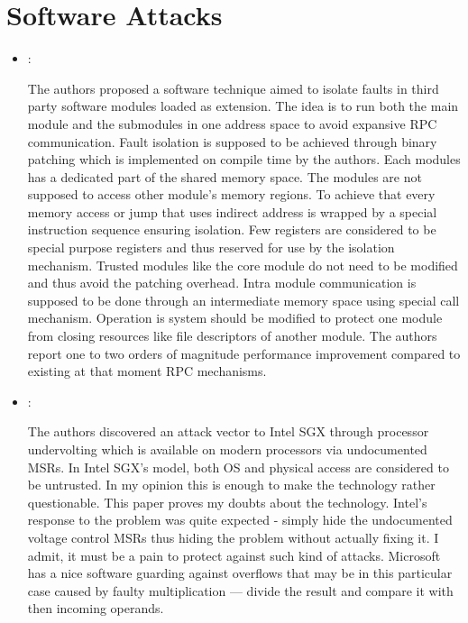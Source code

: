 \section*{Software Attacks}
\begin{itemize}
    \item \cite{Wahbe:SoftwareFaultIsolation:1993}:

    The authors proposed a software technique aimed to isolate faults in third party software modules loaded as extension. The idea is to run both the main module and the submodules in one address space to avoid expansive RPC communication. Fault isolation is supposed to be achieved through binary patching which is implemented on compile time by the authors. Each modules has a dedicated part of the shared memory space. The modules are not supposed to access other module's memory regions. To achieve that every memory access or jump that uses indirect address is wrapped by a special instruction sequence ensuring isolation. Few registers are considered to be special purpose registers and thus reserved for use by the isolation mechanism. Trusted modules like the core module do not need to be modified and thus avoid the patching overhead. Intra module communication is supposed to be done through an intermediate memory space using special call mechanism. Operation is system should be modified to protect one module from closing resources like file descriptors of another module. The authors report one to two orders of magnitude performance improvement compared to existing at that moment RPC mechanisms.

    \item \cite{Murdock:Plundervolt:2020}:

    The authors discovered an attack vector to Intel SGX through processor undervolting which is available on modern processors via undocumented MSRs. In Intel SGX's model, both OS and physical access are considered to be untrusted. In my opinion this is enough to make the technology rather questionable. This paper proves my doubts about the technology. Intel's response to the problem was quite expected - simply hide the undocumented voltage control MSRs thus hiding the problem without actually fixing it. I admit, it must be a pain to protect against such kind of attacks. Microsoft has a nice software guarding against overflows that may be in this particular case caused by faulty multiplication --- divide the result and compare it with then incoming operands.
\end{itemize}

